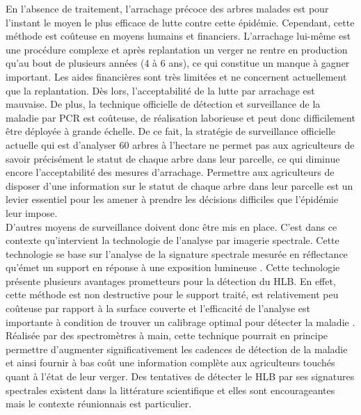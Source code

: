 \documentclass[
  11pt,
  french,
  a4paper,
  extrafontsizes,onecolumn,openright
  ]{memoir}
\begin{document}
En l'absence de traitement, l'arrachage précoce des arbres malades est pour l'instant le moyen le plus efficace de lutte contre cette épidémie. Cependant, cette méthode est coûteuse en moyens humains et financiers. L'arrachage lui-même est une procédure complexe et après replantation un verger ne rentre en production qu'au bout de plusieurs années (4 à 6 ans), ce qui constitue un manque à gagner important. Les aides financières sont très limitées et ne concernent actuellement que la replantation. Dès lors, l'acceptabilité de la lutte par arrachage est mauvaise. De plus, la technique officielle de détection et surveillance de la maladie par PCR est coûteuse, de réalisation laborieuse et peut donc difficilement être déployée à grande échelle. De ce fait, la stratégie de surveillance officielle actuelle qui est d'analyser 60 arbres à l'hectare ne permet pas aux agriculteurs de savoir précisément le statut de chaque arbre dans leur parcelle, ce qui diminue encore l'acceptabilité des mesures d'arrachage. Permettre aux agriculteurs de disposer d'une information sur le statut de chaque arbre dans leur parcelle est un levier essentiel pour les amener à prendre les décisions difficiles que l'épidémie leur impose.\\
D'autres moyens de surveillance doivent donc être mis en place. C'est dans ce contexte qu'intervient la technologie de l'analyse par imagerie spectrale. Cette technologie se base sur l'analyse de la signature spectrale mesurée en réflectance qu'émet un support en réponse à une exposition lumineuse \autocite{sankaran_huanglongbing_2013}. Cette technologie présente plusieurs avantages prometteurs pour la détection du HLB. En effet, cette méthode est non destructive pour le support traité, est relativement peu coûteuse par rapport à la surface couverte et l'efficacité de l'analyse est importante à condition de trouver un calibrage optimal pour détecter la maladie \autocite{sankaran_visible-near_2011}. Réalisée par des spectromètres à main, cette technique pourrait en principe permettre d'augmenter significativement les cadences de détection de la maladie et ainsi fournir à bas coût une information complète aux agriculteurs touchés quant à l'état de leur verger. Des tentatives de détecter le HLB par ses signatures spectrales existent dans la littérature scientifique \autocite{sankaran_visible-near_2011} et elles sont encourageantes mais le contexte réunionnais est particulier.
\end{document}
